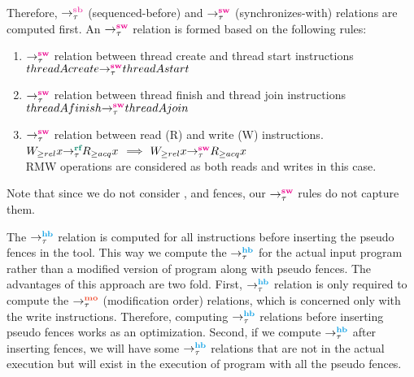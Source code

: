 \par
Therefore, $\setSB$ (sequenced-before) and $\setSW$ (synchronizes-with) 
relations are computed first. 
An $\setSW$ relation is formed based on the following rules:
\begin{enumerate}
\item $\setSW$ relation between thread create and thread start instructions\\
$\sw{\tau}{thread A create}{thread A start}$

\item $\setSW$ relation between thread finish and thread join instructions\\
$\sw{\tau}{thread A finish}{thread A join}$

\item $\setSW$ relation between read (R) and write (W) instructions.\\
$\rf{\tau}{W_{\geq rel}x}{R_{\geq acq}x}$ $\implies$ $\sw{\tau}{W_{\geq rel}x}{R_{\geq acq}x}$\\
RMW operations are considered as both reads and writes in this case.
\end{enumerate}
Note that since we do not consider \moacq, \morel and \moar fences, 
our $\setSW$ rules do not capture them.
\par


%	

\par
The $\setHB$ relation is computed for all instructions before inserting the 
pseudo fences in the tool. 
This way we compute the $\setHB$ for the actual input program rather than a 
modified version of program along with pseudo fences. The advantages of this
approach are two fold. First, $\setHB$ relation is only required 
to compute the $\setMO$ (modification order) relations, which is concerned only 
with the write instructions. Therefore, computing $\setHB$ relations before 
inserting pseudo fences works as an optimization. Second, if we compute $\setHB$
after inserting fences, we will have some $\setHB$ relations that are not in 
the actual execution but will exist in the execution of program with all the 
pseudo fences. 

